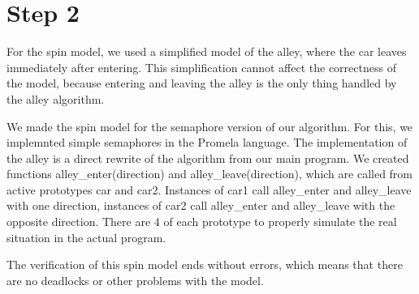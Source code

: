 
\section{Step 2}

For the spin model, we used a simplified model of the alley, where the car leaves immediately after entering. This simplification cannot affect the correctness of the model, because entering and leaving the alley is the only thing handled by the alley algorithm.

We made the spin model for the semaphore version of our algorithm. For this, we implemnted simple semaphores in the Promela language.
The implementation of the alley is a direct rewrite of the algorithm from our main program. We created functions alley\_enter(direction) and alley\_leave(direction), which are called from active prototypes car and car2. Instances of car1 call alley\_enter and alley\_leave with one direction, instances of car2 call alley\_enter and alley\_leave with the opposite direction. There are 4 of each prototype to properly simulate the real situation in the actual program.

The verification of this spin model ends without errors, which means that there are no deadlocks or other problems with the model.